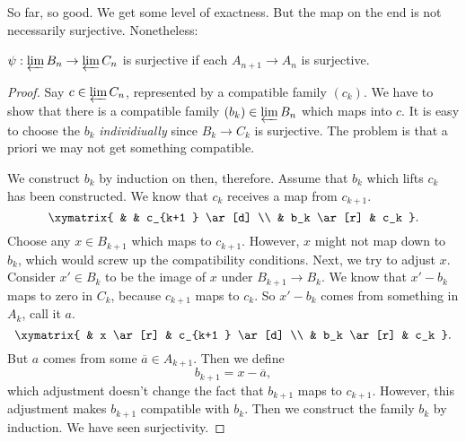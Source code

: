 So far, so good. We get some level of exactness. But the map on the end is not
necessarily surjective. Nonetheless:

\begin{proposition} 
$\psi: \varprojlim B_n \to \varprojlim C_n$ is surjective if each $A_{n+1} \to
A_n$ is surjective.
\end{proposition} 
\begin{proof} 
Say $c \in \varprojlim C_n$, represented by a compatible family $(c_k)$. We
have to show that there is a compatible family $(b_k) \in \varprojlim B_n$
which maps into $c$. It is easy to choose the $b_k$ \emph{individiually} since
$B_k \to C_k$ is surjective. The problem is that a priori we may not get
something compatible.

We construct $b_k$ by induction on then, therefore. Assume that $b_k$ which
lifts $c_k$ has been constructed. 
We know that $c_k$ receives  a map from $c_{k+1}$. 
\[ \xymatrix{
& & c_{k+1 } \ar[d] \\
& b_k \ar[r] &  c_k
}.\]
Choose any $x \in B_{k+1}$ which maps to $c_{k+1}$. However, $x$ might not map
down to $b_k$, which would screw up the compatibility conditions. Next, we try to adjust $x$. 
Consider $x' \in B_k$ to be the image of $x$ under $B_{k+1} \to B_k$. We know
that $x' - b_k$ maps to zero in $C_k$, because $c_{k+1}$ maps to $c_k$.
So $x' - b_k$ comes from something in $A_k$, call it $a$. 
\[ \xymatrix{
& x \ar[r] &  c_{k+1 } \ar[d] \\
& b_k \ar[r] &  c_k
}.\]
But $a$ comes from some $\overline{a} \in A_{k+1}$. Then we define
\[ b_{k+1} = x - \overline{a},  \]
which adjustment doesn't change the fact that $b_{k+1}$ maps to $c_{k+1}$.
However, this adjustment makes $b_{k+1}$ compatible with $b_k$. Then we
construct the family $b_k$ by induction. We have seen surjectivity.
\end{proof} 

